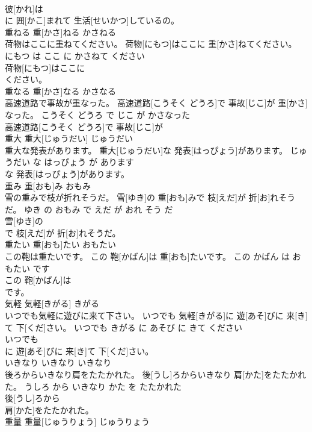 \documentclass[8pt]{extreport}
\begin{document}
\begin{CJK}{UTF8}{min}
\\	彼[かれ]は
\\	に 囲[かこ]まれて 生活[せいかつ]しているの。			
\\	重ねる	重[かさ]ねる	かさねる	
\\	荷物はここに重ねてください。	荷物[にもつ]はここに 重[かさ]ねてください。	にもつ は ここ に かさねて ください	
\\	荷物[にもつ]はここに
\\	ください。			
\\	重なる	重[かさ]なる	かさなる	
\\	高速道路で事故が重なった。	高速道路[こうそく どうろ]で 事故[じこ]が 重[かさ]なった。	こうそく どうろ で じこ が かさなった	
\\	高速道路[こうそく どうろ]で 事故[じこ]が
\\	重大	重大[じゅうだい]	じゅうだい	
\\	重大な発表があります。	重大[じゅうだい]な 発表[はっぴょう]があります。	じゅうだい な はっぴょう が あります	
\\	な 発表[はっぴょう]があります。			
\\	重み	重[おも]み	おもみ	
\\	雪の重みで枝が折れそうだ。	雪[ゆき]の 重[おも]みで 枝[えだ]が 折[お]れそうだ。	ゆき の おもみ で えだ が おれ そう だ	
\\	雪[ゆき]の
\\	で 枝[えだ]が 折[お]れそうだ。			
\\	重たい	重[おも]たい	おもたい	
\\	この鞄は重たいです。	この 鞄[かばん]は 重[おも]たいです。	この かばん は おもたい です	
\\	この 鞄[かばん]は
\\	です。			
\\	気軽	気軽[きがる]	きがる	
\\	いつでも気軽に遊びに来て下さい。	いつでも 気軽[きがる]に 遊[あそ]びに 来[き]て 下[くだ]さい。	いつでも きがる に あそび に きて ください	
\\	いつでも
\\	に 遊[あそ]びに 来[き]て 下[くだ]さい。			
\\	いきなり	いきなり	いきなり	
\\	後ろからいきなり肩をたたかれた。	後[うし]ろからいきなり 肩[かた]をたたかれた。	うしろ から いきなり かた を たたかれた	
\\	後[うし]ろから
\\	肩[かた]をたたかれた。			
\\	重量	重量[じゅうりょう]	じゅうりょう	

\end{CJK}
\end{document}

